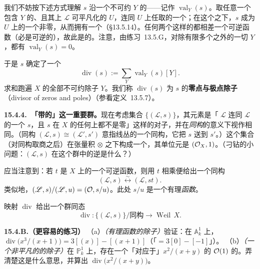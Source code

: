 我们不妨按下述方式理解 $s$ 沿一个不可约\trWeilDivisor{} $Y$ 的\textbf{\trValuation}——记作 $\operatorname{val}_Y(s)$。取任意一个包含 $Y$ 的\trGenericPoint{}、且其上 $\mathscr{L}$ 可平凡化的\trOpenSet{} $U$，连同 $U$ 上任取的一个\trTrivialization；在这个\trTrivialization{}之下，$s$ 成为 $U$ 上的一个非零\trRationalFunction，从而拥有一个\trValuation（\S13.5.14）。任何两个这样的\trTrivialization{}都相差一个可逆函数（\trTransitionFunction{}必是可逆的），故此\trValuation{}是\trWellDefined{}的。注意，由\mbox{练习~13.5.G}，对除有限多个之外的一切 $Y$，都有 $\operatorname{val}_Y(s)=0$。

于是 $s$ 确定了一个\trWeilDivisor
\[
\operatorname{div}(s):=\sum_Y\operatorname{val}_Y(s)[Y].
\]
求和跑遍 $X$ 的全部不可约除子 $Y$。我们称 $\operatorname{div}(s)$ 为\trRational\trSection{} $s$ 的\textbf{零点与极点除子}（divisor of zeros and poles）（参看\mbox{定义~13.5.7}）。

\textbf{15.4.4.\ 「带\trRational\trSection{}的\trLineBundle」这一重要群。}\quad 现在考虑集合 $\{(\mathscr{L},s)\}$，其元素是「\trLineBundle{} $\mathscr{L}$ 连同 $\mathscr{L}$ 的一个\trRational\trSection{} $s$，且 $s$ 在 $X$ 的任何\trIrreducibleComponent{}上都不是零\trSection」这样的对子，并在\emph{同构}的意义下视作相同。（同构 $(\mathscr{L},s)\cong(\mathscr{L}',s')$ 意指线丛的一个同构，它把 $s$ 送到 $s'$。）这个集合（对同构取商之后）在张量积 $\otimes$ 之下构成一个\trAbelian\trGroup，其单位元是 $(\mathcal{O}_X,1)$。（刁钻的小问题：$(\mathscr{L},s)$ 在这个群中的逆是什么？）

应当注意到：若 $t$ 是 $X$ 上的一个可逆函数，则用 $t$ 相乘便给出一个同构
\[
(\mathscr{L},s)\overset{\sim}{\longleftrightarrow}(\mathscr{L},st).
\]
类似地，$(\mathscr{L},s)/(\mathscr{L},u)=(\mathcal{O},s/u)$。此处 $s/u$ 是一个有理\emph{函数}。

映射 $\operatorname{div}$ 给出一个群同态
\begin{equation*}\tag{15.4.4.1}\label{eq:div-group-homomorphism}
\operatorname{div}\colon\{(\mathscr{L},s)\}/\text{同构}\longrightarrow\operatorname{Weil}\,X.
\end{equation*}

\textbf{15.4.B.（更容易的练习）}\quad
（a）\emph{（有理函数的除子）}\quad 验证：在 $\mathbb{A}^1_k$ 上，$\operatorname{div}\bigl(x^3/(x+1)\bigr)=3[(x)]-[(x+1)]$（「$=3[0]-[-1]$」）。
（b）\emph{（一个非平凡\trInvertibleSheaf{}的\trRational\trSection{}的除子）}\quad 在 $\mathbb{P}^1_k$ 上，存在一个「对应于」$x^2/(x+y)$ 的 $\mathcal{O}(1)$ 的\trRational\trSection。弄清楚这是什么意思，并算出 $\operatorname{div}\bigl(x^2/(x+y)\bigr)$。

